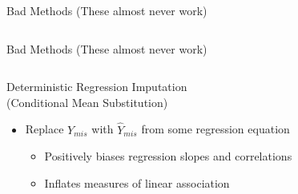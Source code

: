 \documentclass{beamer}\usepackage[]{graphicx}\usepackage[]{color}
\makeatletter
\newenvironment{kframe}{%
 \def\at@end@of@kframe{}%
 \ifinner\ifhmode%
  \def\at@end@of@kframe{\end{minipage}}%
  \begin{minipage}{\columnwidth}%
 \fi\fi%
 \def\FrameCommand##1{\hskip\@totalleftmargin \hskip-\fboxsep
 \colorbox{shadecolor}{##1}\hskip-\fboxsep
     \hskip-\linewidth \hskip-\@totalleftmargin \hskip\columnwidth}%
 \MakeFramed {\advance\hsize-\width
   \@totalleftmargin\z@ \linewidth\hsize
   \@setminipage}}%
 {\par\unskip\endMakeFramed%
 \at@end@of@kframe}
\newenvironment{knitrout}{}{} %
\makeatother
\begin{document}
\begin{frame}{Bad Methods (These almost never work)}
\begin{columns}
\begin{column}{0.5\textwidth}
\begin{knitrout}
{}


\end{knitrout}

\end{column}
\end{columns}

\end{frame}


\begin{frame}{Bad Methods (These almost never work)} 

  \begin{columns}
    \begin{column}{0.5\textwidth}
      
      Deterministic Regression Imputation\\
      (Conditional Mean Substitution)
      \begin{itemize}
      \item Replace $Y_{mis}$ with $\widehat{Y}_{mis}$ from some regression 
        equation
        \begin{itemize}
        \item Positively biases regression slopes and correlations
        \item Inflates measures of linear association
        \end{itemize}
      \end{itemize}
      
    \end{column}
    \begin{column}{0.5\textwidth}
      
\begin{knitrout}\footnotesize
{}\color{fgcolor}\begin{kframe}


{\ttfamily\noindent\bfseries\color{errorcolor}{Error in check.dataform(data): object 'dat3' not found}}

{\ttfamily\noindent\bfseries\color{errorcolor}{Error in complete(miceD, 1): object 'miceD' not found}}

{\ttfamily\noindent\bfseries\color{errorcolor}{Error in datD[!rVec, ] <- NA: object 'datD' not found}}

{\ttfamily\noindent\bfseries\color{errorcolor}{Error in FUN(X[[i]], ...): object 'dat2' not found}}\end{kframe}


\end{knitrout}
\end{column}
\end{columns}
\end{frame}
\end{document}
